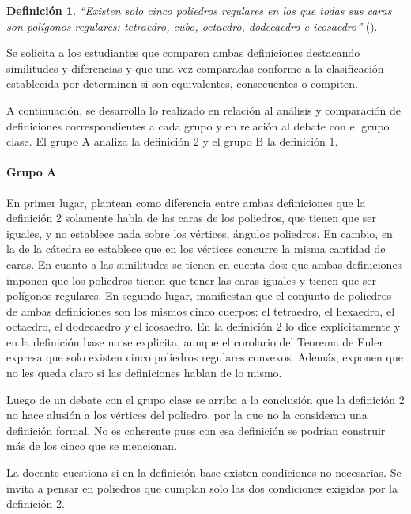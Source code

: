 \documentclass[oneside,spanish]{amsart}
\numberwithin{equation}{section}
\theoremstyle{definition}
\newtheorem{defin}{\bfseries Definición}
\begin{document}
\begin{defin}
	\textit{“Existen solo cinco poliedros regulares en los que todas sus caras son polígonos regulares: tetraedro, cubo, octaedro, dodecaedro e icosaedro”} (\citet{aristegui05}).
\end{defin}

Se solicita a los estudiantes que comparen ambas definiciones destacando similitudes y diferencias y que una vez comparadas conforme a la clasificación establecida por \citet{winicki00} determinen si son equivalentes, consecuentes o compiten.

A continuación, se desarrolla lo realizado en relación al análisis y comparación de definiciones correspondientes a cada grupo y en relación al debate con el grupo clase. El grupo A analiza la definición 2 y el grupo B la definición 1.

\bigskip
\paragraph{\bfseries Grupo A}

En primer lugar, plantean como diferencia entre ambas definiciones que la definición 2 solamente habla de las caras de los poliedros, que tienen que ser iguales, y no establece nada sobre los vértices, ángulos poliedros. En cambio, en la de la cátedra se establece que en los vértices concurre la misma cantidad de caras. En cuanto a las similitudes se tienen en cuenta dos: que ambas definiciones imponen que los poliedros tienen que tener las caras iguales y tienen que ser polígonos regulares. En segundo lugar, manifiestan que el conjunto de poliedros de ambas definiciones son los mismos cinco cuerpos: el tetraedro, el hexaedro, el octaedro, el dodecaedro y el icosaedro. En la definición 2 lo dice explícitamente y en la definición base no se explicita, aunque el corolario del Teorema de Euler expresa que solo existen cinco poliedros regulares convexos. Además, exponen que no les queda claro si las definiciones hablan de lo mismo.

Luego de un debate con el grupo clase se arriba a la conclusión que la definición 2 no hace alusión a los vértices del poliedro, por la que no la consideran una definición formal. No es coherente pues con esa definición se podrían construir más de los cinco que se mencionan.

La docente cuestiona si en la definición base existen condiciones no necesarias. Se invita a pensar en poliedros que cumplan solo las dos condiciones exigidas por la definición 2.
\end{document}
